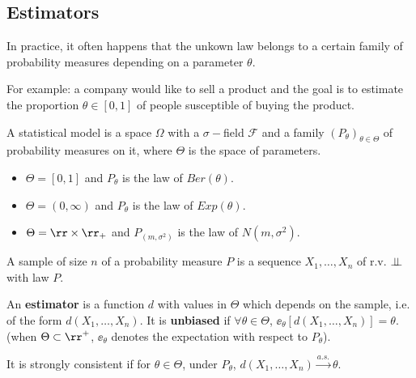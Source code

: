 \documentclass[../main.tex]{subfiles}
\begin{document}
\subsection{Estimators}
In practice, it often happens that the unkown law belongs to a certain family of
probability measures depending on a parameter $\theta$.

For example: a company would like to sell a product and the goal is to estimate
the proportion $\theta \in [0, 1]$ of people susceptible of buying the product.

\begin{definition}
    A statistical model is a space $\Omega$ with a $\sigma-$field $\mathcal{F}$
    and a family $(P_{\theta})_{\theta \in \Theta}$ of probability measures on
    it, where $\Theta$ is the space of parameters.
\end{definition}

\begin{example}
  \hfill
  \begin{itemize}
    \item $\Theta = [0, 1]$ and $P_{\theta}$ is the law of $Ber(\theta)$.
    \item $\Theta = (0, \infty)$ and $P_{\theta}$ is the law of $Exp(\theta)$.
    \item $\Theta = \rr \times \rr_+$ and $P_{(m, \sigma^2)}$ is the law of
      $N(m, \sigma^2)$.
  \end{itemize}
\end{example}

\begin{definition}
    A sample of size $n$ of a probability measure $P$ is a sequence $X_1,
    \ldots, X_n$ of r.v. $\perp\!\!\!\!\,\perp$ with law $P$.

    An \textbf{estimator} is a function $d$ with values in $\Theta$ which
    depends on the sample, i.e. of the form $d(X_1, \ldots, X_n)$. It is
    \textbf{unbiased} if $\forall \theta \in \Theta$, $\ee_{\theta}[d(X_1,
    \ldots, X_n)] = \theta$.
    (when $\Theta \subset \rr^+$, $\ee_\theta$ denotes the expectation with
    respect to $P_\theta$).

    It is strongly consistent if for $\theta \in \Theta$, under $P_\theta$,
    $d(X_1, \ldots, X_n) \overset{a.s.}{\longrightarrow} \theta$.
\end{definition}
    
\end{document}

